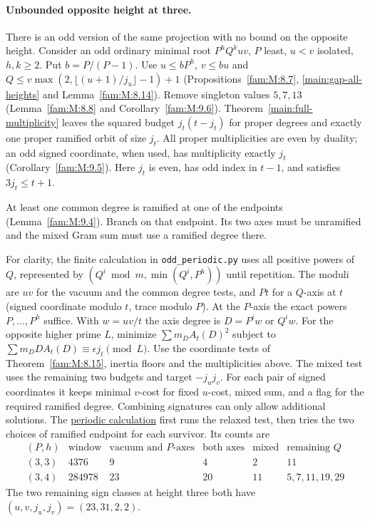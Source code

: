 \documentclass[11pt,a4paper]{article}
\numberwithin{equation}{section}
\theoremstyle{remark}
\begin{document}
\paragraph{Unbounded opposite height at three.} There is an odd version of the same projection with no bound on the
opposite height. Consider an odd ordinary minimal root
$P^hQ^k uv$, $P$ least, $u<v$ isolated, $h,k\ge2$.
Put $b=P/(P-1)$. Use $u\le bP^h$, $v\le bu$ and
$Q\le v\max(2,\lfloor(u+1)/j_u\rfloor-1)+1$
(Propositions~\ref{fam:M:8.7}, \ref{main:gap-all-heights} and Lemma~\ref{fam:M:8.14}).
Remove singleton values $5,7,13$ (Lemma~\ref{fam:M:8.8} and
Corollary~\ref{fam:M:9.6}). Theorem~\ref{main:full-multiplicity}
leaves the squared budget $j_t(t-j_t)$ for proper degrees and
exactly one proper ramified orbit of size $j_t$. All proper
multiplicities are even by duality; an odd signed coordinate,
when used, has multiplicity exactly $j_t$
(Corollary~\ref{fam:M:9.5}). Here $j_t$ is even, has odd index in
$t-1$, and satisfies $3j_t\le t+1$.

At least one
common degree is ramified at one of the endpoints (Lemma~\ref{fam:M:9.4}).
Branch on that endpoint. Its two axes must be unramified and the
mixed Gram sum must use a ramified degree there.

For clarity, the finite calculation in \texttt{odd\_periodic.py}
uses all positive powers of $Q$, represented by
$(Q^i\bmod m,\min(Q^i,P^h))$ until repetition. The moduli are
$uv$ for the vacuum and the common degree tests, and $Pt$ for
a $Q$-axis at $t$ (signed coordinate modulo $t$, trace modulo $P$).
At the $P$-axis the exact powers $P,\ldots,P^h$ suffice.
With $w=uv/t$ the axis degree is $D=P^iw$ or $Q^iw$.
For the opposite higher prime $L$, minimize
$\sum m_D A_t(D)^2$ subject to
$\sum m_D D A_t(D)\equiv\epsilon j_t\pmod L$.
Use the coordinate tests of Theorem~\ref{fam:M:8.15}, inertia floors and the multiplicities above.
The mixed test uses the remaining two budgets and target $-j_uj_v$.
For each pair of signed coordinates it keeps minimal $v$-cost for
fixed $u$-cost, mixed sum, and a flag for the required ramified
degree. Combining signatures can only allow additional solutions.
The \href{https://github.com/sebastienpalcoux/WGT-fusion-categories/blob/f7f9f9a02f3116e61eb9dca4eebfed77001494e8/code/four_primes/odd_periodic.py}{periodic calculation} first runs the relaxed test, then tries the two choices
of ramified endpoint for each survivor. Its counts are
\[
\begin{array}{c|r|r|r|r|l}
 (P,h)&\text{window}&\text{vacuum and $P$-axes}&
 \text{both axes}&\text{mixed}&\text{remaining }Q\\\hline
 (3,3)&4376&9&4&2&11\\
 (3,4)&284978&23&20&11&5,7,11,19,29
\end{array}
\]
The two remaining sign classes at height three both have
$(u,v,j_u,j_v)=(23,31,2,2)$.
\end{document}

